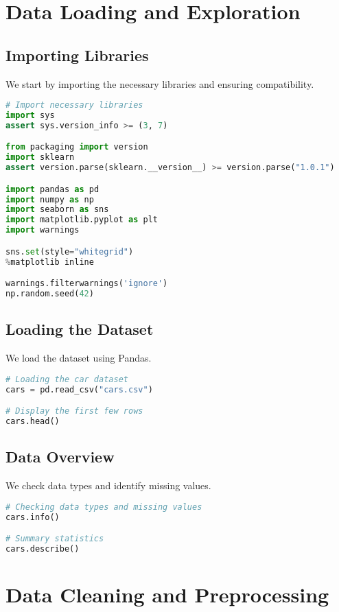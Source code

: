 \documentclass{article}
\begin{document}
\section{Data Loading and Exploration}

\subsection{Importing Libraries}

We start by importing the necessary libraries and ensuring compatibility.

\begin{lstlisting}[language=Python]
# Import necessary libraries
import sys
assert sys.version_info >= (3, 7)

from packaging import version
import sklearn
assert version.parse(sklearn.__version__) >= version.parse("1.0.1")

import pandas as pd
import numpy as np
import seaborn as sns
import matplotlib.pyplot as plt
import warnings

sns.set(style="whitegrid")
%matplotlib inline

warnings.filterwarnings('ignore')
np.random.seed(42)
\end{lstlisting}

\subsection{Loading the Dataset}

We load the dataset using Pandas.

\begin{lstlisting}[language=Python]
# Loading the car dataset
cars = pd.read_csv("cars.csv")

# Display the first few rows
cars.head()
\end{lstlisting}

\subsection{Data Overview}

We check data types and identify missing values.

\begin{lstlisting}[language=Python]
# Checking data types and missing values
cars.info()

# Summary statistics
cars.describe()
\end{lstlisting}

\section{Data Cleaning and Preprocessing}
\end{document}
